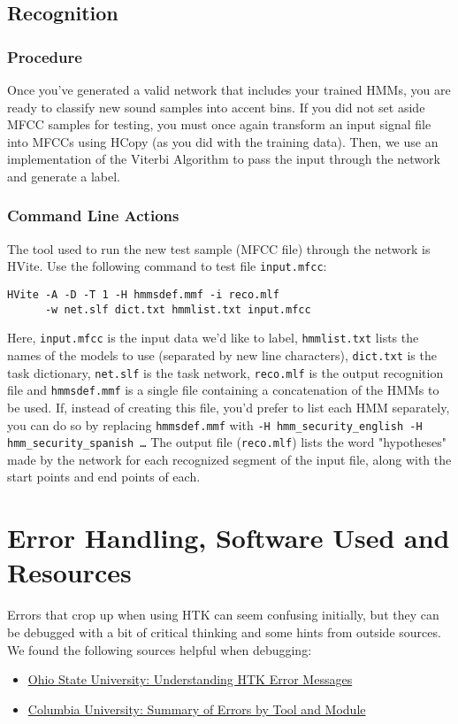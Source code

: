 \documentclass{wileySev}
\begin{document}
\chapter{Recognition}
\section{Procedure}
Once you've generated a valid network that includes your trained HMMs, you are ready to classify new sound samples into accent bins. If you did not set aside MFCC samples for testing, you must once again transform an input signal file into MFCCs using HCopy (as you did with the training data). Then, we use an implementation of the Viterbi Algorithm to pass the input through the network and generate a label.
\section{Command Line Actions}
The tool used to run the new test sample (MFCC file) through the network is HVite. Use the following command to test file \texttt{input.mfcc}:
\begin{verbatim}
HVite -A -D -T 1 -H hmmsdef.mmf -i reco.mlf 
      -w net.slf dict.txt hmmlist.txt input.mfcc
\end{verbatim}
Here, \texttt{input.mfcc} is the input data we'd like to label, \texttt{hmmlist.txt} lists the names of the models to use (separated by new line characters), \texttt{dict.txt} is the task dictionary, \texttt{net.slf} is the task network, \texttt{reco.mlf} is the output recognition file and \texttt{hmmsdef.mmf} is a single file containing a concatenation of the HMMs to be used. If, instead of creating this file, you'd prefer to list each HMM separately, you can do so by replacing \texttt{hmmsdef.mmf} with \texttt{-H hmm\_security\_english -H hmm\_security\_spanish \ldots}
The output file (\texttt{reco.mlf}) lists the word "hypotheses" made by the network for each recognized segment of the input file, along with the start points and end points of each.

\part{Error Handling, Software Used and Resources}

Errors that crop up when using HTK can seem confusing initially, but they can be debugged with a bit of critical thinking and some hints from outside sources. We found the following sources helpful when debugging:
\begin{itemize}
\item \href{http://www.ling.ohio-state.edu/~bromberg/htk_problems.html}{Ohio State University: Understanding HTK Error Messages}
\item \href{http://www.ee.columbia.edu/~dpwe/LabROSA/doc/HTKBook21/node256.html}{Columbia University: Summary of Errors by Tool and Module}
\end{itemize}
\end{document}
